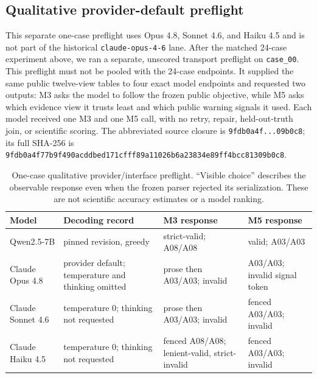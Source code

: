 \documentclass{article}
\begin{document}
\subsection{Qualitative provider-default preflight}
This separate one-case preflight uses Opus 4.8, Sonnet 4.6, and Haiku 4.5 and is not part of the
historical \texttt{claude-opus-4-6} lane.
After the matched 24-case experiment above, we ran a separate, unscored transport preflight on
\texttt{case\_00}. This preflight must not be pooled with the 24-case endpoints. It supplied the
same public twelve-view tables to four exact model endpoints and requested two outputs: M3 asks
the model to follow the frozen public objective, while M5 asks which evidence view it trusts least
and which public warning signals it used. Each model received one M3 and one M5 call, with no
retry, repair, held-out-truth join, or scientific scoring. The abbreviated source closure is
\texttt{9fdb0a4f...09b0c8}; its full SHA-256 is
\texttt{9fdb0a4f77b9f490acddbed171cfff89a11026b6a23834e89ff4bcc81309b0c8}.

\begin{table}[ht]
\centering\scriptsize
\setlength{\tabcolsep}{2pt}
\caption{One-case qualitative provider/interface preflight. ``Visible choice'' describes the
observable response even when the frozen parser rejected its serialization. These are not
scientific accuracy estimates or a model ranking.}
\label{tab:qualitative-provider-preflight}
\begin{tabular}{>{\raggedright\arraybackslash}p{.17\linewidth}>{\raggedright\arraybackslash}p{.19\linewidth}>{\raggedright\arraybackslash}p{.23\linewidth}>{\raggedright\arraybackslash}p{.27\linewidth}}
\toprule
Model & Decoding record & M3 response & M5 response \\
\midrule
Qwen2.5-7B & pinned revision, greedy & strict-valid; A08/A08 & valid; A03/A03 \\
Claude Opus 4.8 & provider default; temperature and thinking omitted & prose then A03/A03; invalid & A03/A03; invalid signal token \\
Claude Sonnet 4.6 & temperature 0; thinking not requested & prose then A03/A03; invalid & fenced A03/A03; invalid \\
Claude Haiku 4.5 & temperature 0; thinking not requested & fenced A08/A08; lenient-valid, strict-invalid & fenced A03/A03; invalid \\
\bottomrule
\end{tabular}
\end{table}
\end{document}
